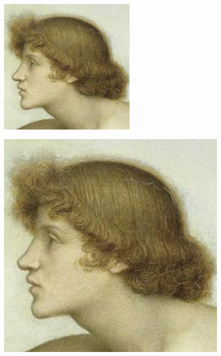 \documentclass{article}
\theoremstyle{definition}
\begin{document}
\begin{figure}[h]
\centering
\begin{minipage}{.5\textwidth}
  \centering
  \includegraphics[width=.8\linewidth]{Imagenes/Phosphorus_and_Hesperus_original.png}
  \label{fig:test1}
\end{minipage}%
\begin{minipage}{.5\textwidth}
  \centering
  \includegraphics[width=.8\linewidth]{Imagenes/Phosphorus_and_Hesperus_Paint_Shop_Pro.png}
  \label{fig:test2}
\end{minipage}
\end{figure}
\end{document}
